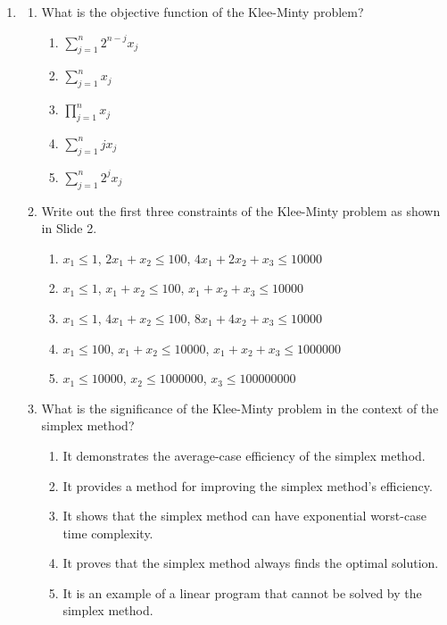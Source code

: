 \documentclass{article}%
\begin{document}
\begin{enumerate}
\begin{enumerate}%
\item $\bar{x}_1 = x_1, \bar{x}_2 = x_2, \bar{x}_3 = x_3$%
\item $\bar{x}_1 = x_1, \bar{x}_2 = 0.1x_2, \bar{x}_3 = 0.01x_3$%
\item $\bar{x}_1 = x_1, \bar{x}_2 = 10x_2, \bar{x}_3 = 100x_3$%
\item $\bar{x}_1 = x_1, \bar{x}_2 = 0.01x_2, \bar{x}_3 = 0.0001x_3$%
\item $\bar{x}_1 = 10x_1, \bar{x}_2 = 100x_2, \bar{x}_3 = 1000x_3$%
\end{enumerate}%
\vspace{1em}%
\item%
\begin{enumerate}%
\item What is the objective function of the Klee-Minty problem?%
\begin{enumerate}%
\item $\sum_{j=1}^n 2^{n-j} x_j$%
\item $\sum_{j=1}^n x_j$%
\item $\prod_{j=1}^n x_j$%
\item $\sum_{j=1}^n j x_j$%
\item $\sum_{j=1}^n 2^j x_j$%
\end{enumerate}%
\vspace{0.5em}%
\item Write out the first three constraints of the Klee-Minty problem as shown in Slide 2.%
\begin{enumerate}%
\item $x_1 \le 1$, $2x_1 + x_2 \le 100$, $4x_1 + 2x_2 + x_3 \le 10000$%
\item $x_1 \le 1$, $x_1 + x_2 \le 100$, $x_1 + x_2 + x_3 \le 10000$%
\item $x_1 \le 1$, $4x_1 + x_2 \le 100$, $8x_1 + 4x_2 + x_3 \le 10000$%
\item $x_1 \le 100$, $x_1 + x_2 \le 10000$, $x_1 + x_2 + x_3 \le 1000000$%
\item $x_1 \le 10000$, $x_2 \le 1000000$, $x_3 \le 100000000$%
\end{enumerate}%
\vspace{0.5em}%
\item What is the significance of the Klee-Minty problem in the context of the simplex method?%
\begin{enumerate}%
\item It demonstrates the average-case efficiency of the simplex method.%
\item It provides a method for improving the simplex method's efficiency.%
\item It shows that the simplex method can have exponential worst-case time complexity.%
\item It proves that the simplex method always finds the optimal solution.%
\item It is an example of a linear program that cannot be solved by the simplex method.%
\end{enumerate}%
\vspace{0.5em}%
\end{enumerate}%
\end{enumerate}
\end{document}
